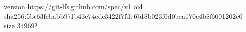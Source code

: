 version https://git-lfs.github.com/spec/v1
oid sha256:5bc63fcbabb971b43e74ede3422f7fd76b18b023f0d0bea170c4b8f6001202c0
size 349692

